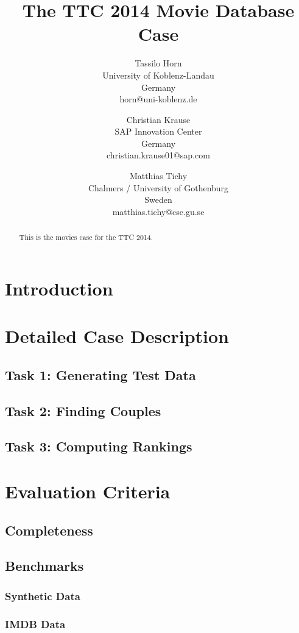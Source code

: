 \documentclass[a4paper]{article}
\title{The TTC 2014 Movie Database Case}
\author{
Tassilo Horn\\ University of Koblenz-Landau\\ Germany\\ horn@uni-koblenz.de
\and
Christian Krause\\ SAP Innovation Center\\ Germany\\ christian.krause01@sap.com
\and
Matthias Tichy\\ Chalmers / University of Gothenburg\\ Sweden\\ matthias.tichy@cse.gu.se
}
\begin{document}
\maketitle

\begin{abstract}
This is the movies case for the TTC 2014.
\end{abstract}
\vskip 32pt


\section{Introduction}

\section{Detailed Case Description}

\subsection{Task 1: Generating Test Data}

\subsection{Task 2: Finding Couples}

\subsection{Task 3: Computing Rankings}

\section{Evaluation Criteria}

\subsection{Completeness}

\subsection{Benchmarks}

\subsubsection{Synthetic Data}

\subsubsection{IMDB Data}
\end{document}
